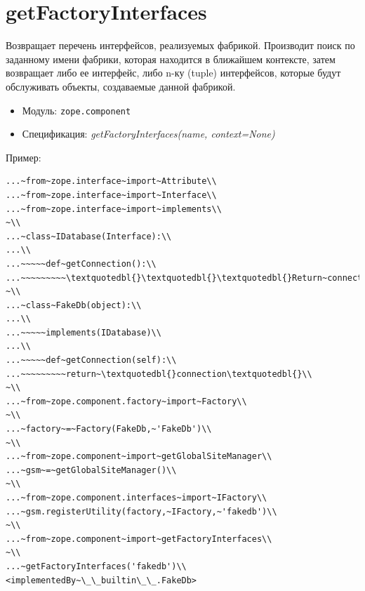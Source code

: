 \documentclass[a4paper,openany,twoside,draft]{book}
\providecommand*{\DUroletitlereference}[1]{\textsl{#1}}
\begin{document}
\section*{getFactoryInterfaces%
  \label{getfactoryinterfaces}%
}

Возвращает перечень интерфейсов, реализуемых фабрикой.  Производит
поиск по заданному имени фабрики, которая находится в ближайшем
контексте, затем возвращает либо ее интерфейс, либо n-ку (tuple)
интерфейсов, которые будут обслуживать объекты, создаваемые данной
фабрикой.

\begin{itemize}

\item Модуль: \texttt{zope.component}

\item Спецификация: \DUroletitlereference{getFactoryInterfaces(name, context=None)}

\end{itemize}

Пример:

\begin{verbatim}
...~from~zope.interface~import~Attribute\\
...~from~zope.interface~import~Interface\\
...~from~zope.interface~import~implements\\
~\\
...~class~IDatabase(Interface):\\
...\\
...~~~~~def~getConnection():\\
...~~~~~~~~~\textquotedbl{}\textquotedbl{}\textquotedbl{}Return~connection~object\textquotedbl{}\textquotedbl{}\textquotedbl{}\\
~\\
...~class~FakeDb(object):\\
...\\
...~~~~~implements(IDatabase)\\
...\\
...~~~~~def~getConnection(self):\\
...~~~~~~~~~return~\textquotedbl{}connection\textquotedbl{}\\
~\\
...~from~zope.component.factory~import~Factory\\
~\\
...~factory~=~Factory(FakeDb,~'FakeDb')\\
~\\
...~from~zope.component~import~getGlobalSiteManager\\
...~gsm~=~getGlobalSiteManager()\\
~\\
...~from~zope.component.interfaces~import~IFactory\\
...~gsm.registerUtility(factory,~IFactory,~'fakedb')\\
~\\
...~from~zope.component~import~getFactoryInterfaces\\
~\\
...~getFactoryInterfaces('fakedb')\\
<implementedBy~\_\_builtin\_\_.FakeDb>
\end{verbatim}
\end{document}
